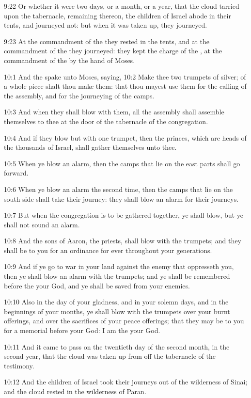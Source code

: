 9:22 Or whether it were two days, or a month, or a year, that the
cloud tarried upon the tabernacle, remaining thereon, the children of
Israel abode in their tents, and journeyed not: but when it was taken
up, they journeyed.

9:23 At the commandment of the \LORD they rested in the tents, and at
the commandment of the \LORD they journeyed: they kept the charge of
the \LORD, at the commandment of the \LORD by the hand of Moses.

10:1 And the \LORD spake unto Moses, saying, 10:2 Make thee two
trumpets of silver; of a whole piece shalt thou make them: that thou
mayest use them for the calling of the assembly, and for the
journeying of the camps.

10:3 And when they shall blow with them, all the assembly shall
assemble themselves to thee at the door of the tabernacle of the
congregation.

10:4 And if they blow but with one trumpet, then the princes, which
are heads of the thousands of Israel, shall gather themselves unto
thee.

10:5 When ye blow an alarm, then the camps that lie on the east parts
shall go forward.

10:6 When ye blow an alarm the second time, then the camps that lie on
the south side shall take their journey: they shall blow an alarm for
their journeys.

10:7 But when the congregation is to be gathered together, ye shall
blow, but ye shall not sound an alarm.

10:8 And the sons of Aaron, the priests, shall blow with the trumpets;
and they shall be to you for an ordinance for ever throughout your
generations.

10:9 And if ye go to war in your land against the enemy that
oppresseth you, then ye shall blow an alarm with the trumpets; and ye
shall be remembered before the \LORD your God, and ye shall be saved
from your enemies.

10:10 Also in the day of your gladness, and in your solemn days, and
in the beginnings of your months, ye shall blow with the trumpets over
your burnt offerings, and over the sacrifices of your peace offerings;
that they may be to you for a memorial before your God: I am the \LORD
your God.

10:11 And it came to pass on the twentieth day of the second month, in
the second year, that the cloud was taken up from off the tabernacle
of the testimony.

10:12 And the children of Israel took their journeys out of the
wilderness of Sinai; and the cloud rested in the wilderness of Paran.

